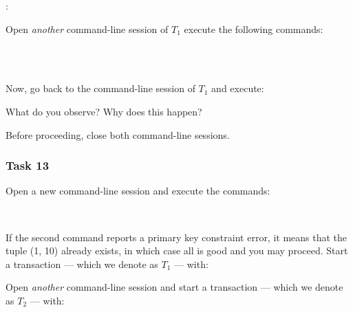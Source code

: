 \vgap

\noindent {}:

\vgap

\noindent {}

\vgap

\noindent Open {\em another} command-line session of $T_1$ execute the following commands:

\vgap

\noindent {}  \\
\noindent {}  \\
\noindent {}

\vgap

\noindent Now, go back to the command-line session of $T_1$ and execute:

\vgap

\noindent {}

\vgap

\noindent What do you observe? Why does this happen?

\vgap

\noindent Before proceeding, close both command-line sessions.


\subsubsection{Task 13}

Open a new command-line session and execute the commands:

\vgap

\noindent {} \\
\noindent {}

\vgap

\noindent If the second command reports a primary key constraint error, it means that the tuple (1, 10) already exists, in which case all is good and you may proceed. Start a transaction --- which we denote as $T_1$ --- with:

\vgap

\noindent {}

\vgap

\noindent Open {\em another} command-line session and start a transaction --- which we denote as $T_2$ --- with:

\vgap

